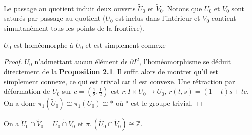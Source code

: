 \bigskip\\
Le passage au quotient induit deux ouverts $\tilde{U}_0$ et $\tilde{V}_0$. Notons que $U_0$ et $V_0$ sont saturés par passage au quotient ($U_0$ est inclus dans l'intérieur et $V_0$ contient simultanément tous les points de la frontière).
\begin{corollaire}
    $U_0$ est homéomorphe à $\tilde{U}_0$ et est simplement connexe
\end{corollaire}
\begin{proof}
    $U_0$ n'admettant aucun élément de $\partial I^2$, l'homéomorphisme se déduit directement de la \textbf{Proposition 2.1}. Il suffit alors de montrer qu'il est simplement connexe, ce qui est trivial car il est convexe. Une rétraction par déformation de $U_0$ sur $c=(\frac{1}{2},\frac{1}{2})$ est $r:I\times U_0\rightarrow U_0$, $r(t,s)=(1-t)s+tc$. On a donc $\pi_1(\tilde{U}_0)\cong\pi_1(U_0)\cong*$ où $*$ est le groupe trivial.
\end{proof}
\begin{proposition}
    On a $\tilde{U}_0\cap\tilde{V}_0=\widetilde{U_0\cap V_0}$ et $\pi_1(\tilde{U}_0\cap\tilde{V}_0)\cong\mathbb{Z}$.
\end{proposition}
